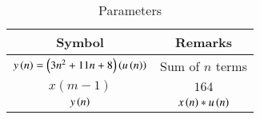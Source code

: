 \setlength{\arrayrulewidth}{0.3mm}
\setlength{\tabcolsep}{15pt}
\renewcommand{\arraystretch}{1.4}

\begin{table}[ht]
\centering

\begin{tabular}{|c|c|}
\hline

\textbf{Symbol} & \textbf{Remarks}\\
\hline
$y\left(n\right) =\left(3n^2+11n+8\right)\left(u\left(n\right)\right)$ & Sum of $n$ terms  \\
\hline
$x(m-1)$ & $164$\\
\hline
$y\left(n\right)$ & $x\left(n\right) * u\left(n\right)$\\
\hline

\end{tabular}
\vspace{0.25cm}
\caption{Parameters}
\label{tab:11.9.2.13.1}



\end{table}
